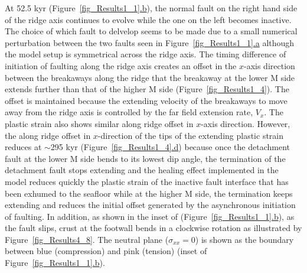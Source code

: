 At 52.5 kyr (Figure~\hyperref[fig_Results1_1]{\ref{fig_Results1_1}.b}), the normal fault on the right hand side of the ridge axis continues to evolve while the one on the left becomes inactive. The choice of which fault to delvelop seems to be made due to a small numerical perturbation between the two faults seen in Figure~\hyperref[fig_Results1_1]{\ref{fig_Results1_1}.a} although the model setup is symmetrical across the ridge axis. The timing difference of initiation of faulting along the ridge axis creates an offset in the $x$-axis direction between the breakaways along the ridge that the breakaway at the lower M side extends further than that of the higher M side (Figure~\hyperref[fig_Results1_4]{\ref{fig_Results1_4}}). The offset is maintained because the extending velocity of the breakaways to move away from the ridge axis is controlled by the far field extension rate, $V_{x}$. The plastic strain also shows similar along ridge offset in $x$-axis direction. However, the along ridge offset in $x$-direction of the tips of the extending plastic strain reduces at $\sim$295 kyr (Figure~\hyperref[fig_Results1_4]{\ref{fig_Results1_4}.d}) because once the detachment fault at the lower M side bends to its lowest dip angle, the termination of the detachment fault stops extending and the healing effect implemented in the model reduces quickly the plastic strain of the inactive fault interface that has been exhumed to the seafloor while at the higher M side, the termination keeps extending and reduces the initial offset generated by the asynchronous initiation of faulting. In addition, as shown in the inset of (Figure~\hyperref[fig_Results1_1]{\ref{fig_Results1_1}.b}), as the fault slips, crust at the footwall bends in a clockwise rotation as illustrated by Figure~\hyperref[fig_Results4_8]{\ref{fig_Results4_8}}. The neutral plane ($\sigma_{xx}=0$) is shown as the boundary between blue (compression) and pink (tension) (inset of Figure~\hyperref[fig_Results1_1]{\ref{fig_Results1_1}.b}). 



